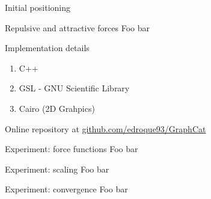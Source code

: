 \documentclass{beamer}
\begin{document}
\begin{frame}{Initial positioning}

\end{frame}

\begin{frame}{Repulsive and attractive forces}
Foo bar
\end{frame}

\begin{frame}{Implementation details}
\begin{enumerate}
\item C++
\item GSL - GNU Scientific Library
\item Cairo (2D Grahpics)
\end{enumerate}
\begin{center}
Online repository at \url{github.com/edroque93/GraphCat}
\end{center}
\end{frame}

\begin{frame}{Experiment: force functions}
Foo bar
\end{frame}

\begin{frame}{Experiment: scaling}
Foo bar
\end{frame}

\begin{frame}{Experiment: convergence}
Foo bar
\end{frame}
\end{document}
